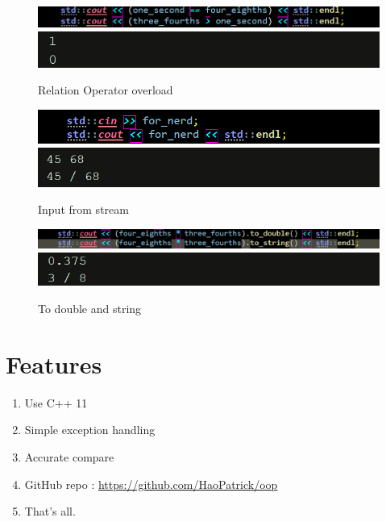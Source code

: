 \documentclass[a4paper]{article}
\begin{document}
\begin{figure}[h]
	\caption{Relation Operator overload}
	\includegraphics[width=\textwidth]{4.png}
	\includegraphics[width=\textwidth]{4-1.png}
\end{figure}


\begin{figure}[h]
	\caption{Input from stream}
	\includegraphics[width=\textwidth]{5.png}
	\includegraphics[width=\textwidth]{5-1.png}
\end{figure}

\begin{figure}[h]
	\caption{To double and string}
	\includegraphics[width=\textwidth]{6.png}
	\includegraphics[width=\textwidth]{6-1.png}
\end{figure}

\newpage
\section{Features}
\begin{enumerate}
	\item Use C++ 11
	\item Simple exception handling
	\item Accurate compare
	\item GitHub repo :
	\href{https://github.com/HaoPatrick/oop}{https://github.com/HaoPatrick/oop} 
	\item That's all.
\end{enumerate}
\end{document}
